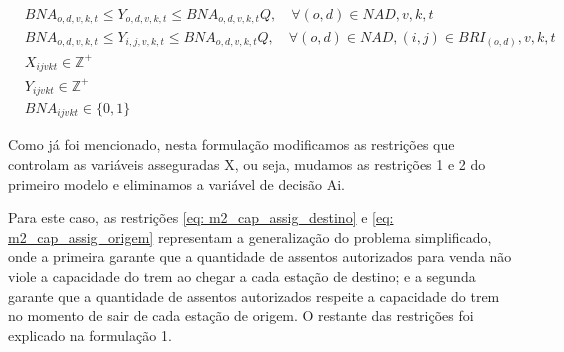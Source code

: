 \begin{align}
	& BNA_{o,d,v,k,t} \leq Y_{o,d,v,k,t} \leq BNA_{o,d,v,k,t} Q, \quad  \forall (o,d)\in NAD, v, k, t                                 \label{eq: m2_activ_bin_autho}             \\
	& BNA_{o,d,v,k,t} \leq Y_{i,j,v,k,t} \leq BNA_{o,d,v,k,t} Q, \quad  \forall (o,d)\in NAD, (i,j) \in BRI_{(o,d)}, v,k,t            \label{eq: m2_autho_igualar_trecho_maior}  \\
	& X_{ijvkt} \in \mathbb{Z}^+                                                                                                      \label{eq: m2_dom_assig}                   \\
	& Y_{ijvkt} \in \mathbb{Z}^+                                                                                                      \label{eq: m2_dom_autho}                   \\
	& BNA_{ijvkt} \in \{0,1\}                                                                                                         \label{eq: m2_dom_bin_nadja}
\end{align}

Como já foi mencionado, nesta formulação modificamos as restrições que controlam as variáveis asseguradas X, ou seja, mudamos as restrições 1 e 2 do primeiro modelo e eliminamos a variável de decisão Ai.



Para este caso, as restrições \ref{eq: m2_cap_assig_destino} e \ref{eq: m2_cap_assig_origem} representam a generalização do problema simplificado, onde a primeira garante que a quantidade de assentos autorizados para venda não viole a capacidade do trem ao chegar a cada estação de destino; e a segunda garante que a quantidade de assentos autorizados respeite a capacidade do trem no momento de sair de cada estação de origem. O restante das restrições foi explicado na formulação 1.